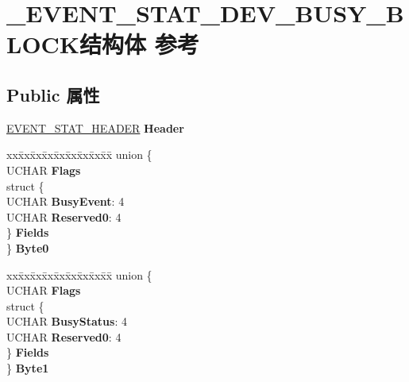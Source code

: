 \hypertarget{struct___e_v_e_n_t___s_t_a_t___d_e_v___b_u_s_y___b_l_o_c_k}{}\section{\+\_\+\+E\+V\+E\+N\+T\+\_\+\+S\+T\+A\+T\+\_\+\+D\+E\+V\+\_\+\+B\+U\+S\+Y\+\_\+\+B\+L\+O\+C\+K结构体 参考}
\label{struct___e_v_e_n_t___s_t_a_t___d_e_v___b_u_s_y___b_l_o_c_k}
\subsection*{Public 属性}
\begin{DoxyCompactItemize}
\item 
\mbox{\label{struct___e_v_e_n_t___s_t_a_t___d_e_v___b_u_s_y___b_l_o_c_k_a79744d3dbeb5b9fd402b6f3b97efd0b3}} 
\hyperlink{struct___e_v_e_n_t___s_t_a_t___h_e_a_d_e_r}{E\+V\+E\+N\+T\+\_\+\+S\+T\+A\+T\+\_\+\+H\+E\+A\+D\+ER} {\bfseries Header}
\item 
\mbox{\label{struct___e_v_e_n_t___s_t_a_t___d_e_v___b_u_s_y___b_l_o_c_k_ab672840b0be17fa06f5698b05de32eb7}} 
\begin{tabbing}
xx\=xx\=xx\=xx\=xx\=xx\=xx\=xx\=xx\=\kill
union \{\\
\>UCHAR {\bfseries Flags}\\
\>struct \{\\
\>\>UCHAR {\bfseries BusyEvent}: 4\\
\>\>UCHAR {\bfseries Reserved0}: 4\\
\>\} {\bfseries Fields}\\
\} {\bfseries Byte0}\\

\end{tabbing}\item 
\mbox{\label{struct___e_v_e_n_t___s_t_a_t___d_e_v___b_u_s_y___b_l_o_c_k_a67d16a755aae74a91844b46b7b4ff34d}} 
\begin{tabbing}
xx\=xx\=xx\=xx\=xx\=xx\=xx\=xx\=xx\=\kill
union \{\\
\>UCHAR {\bfseries Flags}\\
\>struct \{\\
\>\>UCHAR {\bfseries BusyStatus}: 4\\
\>\>UCHAR {\bfseries Reserved0}: 4\\
\>\} {\bfseries Fields}\\
\} {\bfseries Byte1}\\


\end{tabbing}
\end{DoxyCompactItemize}

